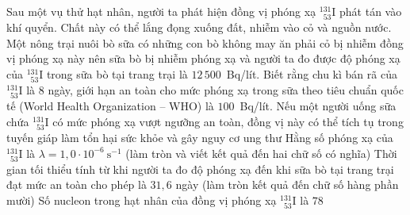 	\begin{ex}%
		Sau một vụ thử hạt nhân, người ta phát hiện đồng vị phóng xạ $^{131}_{\phantom{1}53}\text{I}$ phát tán vào khí quyển. Chất này có thể lắng đọng xuống đất, nhiễm vào cỏ và nguồn nước. Một nông trại nuôi bò sữa có những con bò không may ăn phải cỏ bị nhiễm đồng vị phóng xạ này nên sữa bò bị nhiễm phóng xạ và người ta đo được độ phóng xạ của $^{131}_{\phantom{1}53}\text{I}$ trong sữa bò tại trang trại là $12\,500$~Bq/lít. Biết rằng chu kì bán rã của $^{131}_{\phantom{1}53}\text{I}$ là $8$ ngày, giới hạn an toàn cho mức phóng xạ trong sữa theo tiêu chuẩn quốc tế (World Health Organization -- WHO) là $100$~Bq/lít.
		\choiceTFt
		{\True Nếu một người uống sữa chứa $^{131}_{\phantom{1}53}\text{I}$ có mức phóng xạ vượt ngưỡng an toàn, đồng vị này có thể tích tụ trong tuyến giáp làm tổn hại sức khỏe và gây nguy cơ ung thư}
		{\True Hằng số phóng xạ của $^{131}_{\phantom{1}53}\text{I}$ là $\lambda=1{,}0\cdot 10^{-6}~\text{s}^{-1}$ (làm tròn và viết kết quả đến hai chữ số có nghĩa)}
		{Thời gian tối thiểu tính từ khi người ta đo độ phóng xạ đến khi sữa bò tại trang trại đạt mức an toàn cho phép là $31{,}6$ ngày (làm tròn kết quả đến chữ số hàng phần mười)}
		{Số nucleon trong hạt nhân của đồng vị phóng xạ $^{131}_{\phantom{1}53}\text{I}$ là $78$}
	\end{ex}

